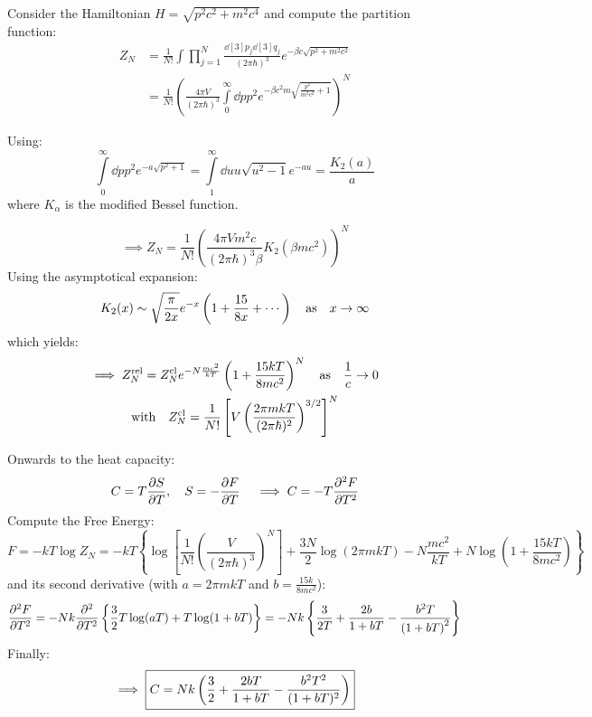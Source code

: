 \documentclass[11pt,a4paper]{scrartcl}
\begin{document}
Consider the Hamiltonian $H=\sqrt{p^2c^2+m^2c^4}$ and compute the partition
function:
\begin{align*}
    Z_N&=\frac{1}{N!}\int\prod_{j=1}^{N}\frac{\dd[3]{p_j}\dd[3]{q_j}}{(2\pi\hbar)^3}
    e^{-\beta c\sqrt{p^2+m^2c^2}}\\
    &=\frac{1}{N!}\left(\frac{4\pi V}{(2\pi\hbar)^3}
    \int\limits_{0}^{\infty}\dd{p}p^2e^{-\beta c^2 m\sqrt{\frac{p^2}{m^2
    c^2}+1}}\right)^N
\end{align*}

Using:
\begin{equation*}
    \int\limits_{0}^{\infty}\dd{p}p^2e^{-a\sqrt{p^2+1}}
    =\int\limits_{1}^{\infty}\dd{u}u\sqrt{u^2-1}e^{-au}
    =\frac{K_2(a)}{a}
\end{equation*}
where $K_{\alpha}$ is the modified Bessel function.

\begin{equation*}
    \implies Z_N=\frac{1}{N!}\left(\frac{4\pi Vm^2c}{(2\pi\hbar)^3
    \beta}K_2(\beta m c^2)\right)^N
\end{equation*}
Using the asymptotical expansion:
\begin{equation*}
    K_2(x)\sim\sqrt{\frac{\pi}{2x}}e^{-x}\left(1+\frac{15}{8x}+\cdots\right)
    \qas x\to\infty
\end{equation*}
which yields:
\begin{gather*}
    \implies
    Z_N^{\mathrm{rel}}=Z_N^{\mathrm{cl}}e^{-N\frac{mc^2}{kT}}\left(1+\frac{15kT}{8mc^2}\right)^N
    \qas \frac{1}{c}\to0 \\
    \qq*{with}Z_N^{\mathrm{cl}}=\frac{1}{N!}\left[V\left(\frac{2\pi
    mkT}{(2\pi\hbar)^2}\right)^{3/2}\right]^N
\end{gather*}

Onwards to the heat capacity:
\begin{equation*}
    C=T\pdv{S}{T}\qc S=-\pdv{F}{T}\quad
    \implies C=-T\pdv[2]{F}{T}
\end{equation*}
Compute the Free Energy:
\begin{equation*}
    F=-kT\log Z_N
    =-kT\left\{\log\left[\frac{1}{N!}\left(\frac{V}{(2\pi\hbar)^3}\right)^N\right]
    +\frac{3N}{2}\log(2\pi
    mkT)-N\frac{mc^2}{kT}+N\log(1+\frac{15kT}{8mc^2})\right\}
\end{equation*}
and its second derivative (with $a=2\pi mkT$ and $b=\frac{15k}{8mc^2}$):
\begin{equation*}
    \pdv[2]{F}{T}=-Nk\pdv[2]{T}\left\{\frac{3}{2}T\log(aT)+T\log(1+bT)\right\}
    =-Nk\left\{\frac{3}{2T}+\frac{2b}{1+bT}-\frac{b^2T}{\left(1+bT\right)^2}
    \right\}
\end{equation*}
Finally:
\begin{equation*}
    \implies\boxed{%
    C=Nk\left(\frac{3}{2}+\frac{2bT}{1+bT}-\frac{b^2T^2}{(1+bT)^2}\right)}
\end{equation*}
\end{document}
